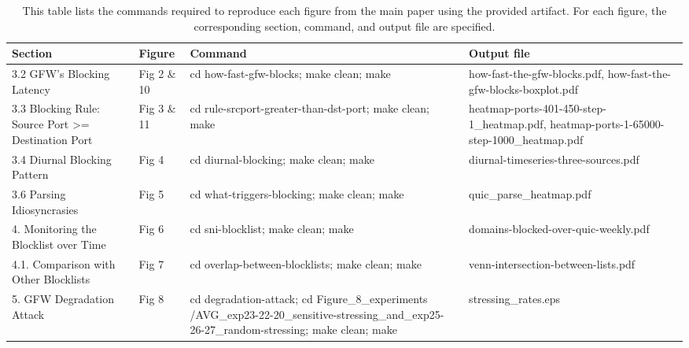 
\begin{table*}[t]
    \centering
    \small
    \begin{tabularx}{\linewidth}{|X|X|X|X|} 
        \hline
    \textbf{Section} & \textbf{Figure} & \textbf{Command} & \textbf{Output file} \\

    \hline
    3.2 GFW's Blocking Latency & Fig 2 \& 10 & cd how-fast-gfw-blocks; make clean; make & how-fast-the-gfw-blocks.pdf, how-fast-the-gfw-blocks-boxplot.pdf \\
    \hline
    3.3 Blocking Rule: Source Port \textgreater{}= Destination Port & Fig 3 \& 11 & cd rule-srcport-greater-than-dst-port; make clean; make & heatmap-ports-401-450-step-1\_heatmap.pdf, heatmap-ports-1-65000-step-1000\_heatmap.pdf \\
    \hline
    3.4 Diurnal Blocking Pattern & Fig 4 & cd diurnal-blocking; make clean; make & diurnal-timeseries-three-sources.pdf \\
    \hline
    3.6 Parsing Idiosyncrasies & Fig 5 & cd what-triggers-blocking; make clean; make & quic\_parse\_heatmap.pdf \\
    \hline
    4. Monitoring the Blocklist over Time & Fig 6 & cd sni-blocklist; make clean; make & domains-blocked-over-quic-weekly.pdf \\
    \hline
    4.1. Comparison with Other Blocklists & Fig 7 & cd overlap-between-blocklists; make clean; make & venn-intersection-between-lists.pdf \\
    \hline
    5. GFW Degradation Attack & Fig 8 & \small{cd degradation-attack; cd Figure\_8\_experiments /AVG\_exp23-22-20\_sensitive-stressing\_and\_exp25-26-27\_random-stressing; make clean; make} & stressing\_rates.eps \\
    \hline
    \end{tabularx}
    \label{tab:t1}

    \caption{This table lists the commands required to reproduce each figure from the main paper using the provided artifact. For each figure, the corresponding section, command, and output file are specified.}
\end{table*}




